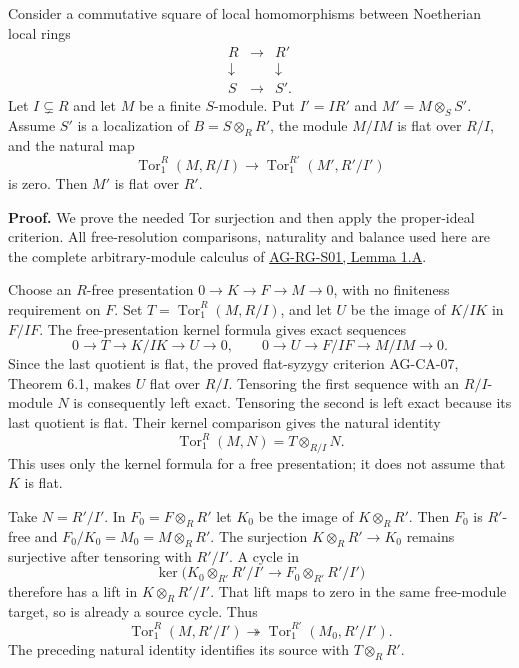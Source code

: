 \documentclass[11pt,a4paper,openany]{report}
\begin{document}
Consider a commutative square of local homomorphisms between Noetherian local rings \[
\begin{array}{ccc}
R&\longrightarrow&R'\\
\downarrow&&\downarrow\\
S&\longrightarrow&S'.
\end{array}
\] Let \(I\subsetneq R\) and let \(M\) be a finite \(S\)-module. Put \(I'=IR'\) and \(M'=M\otimes_SS'\). Assume \(S'\) is a localization of \(B=S\otimes_RR'\), the module \(M/IM\) is flat over \(R/I\), and the natural map \[\operatorname{Tor}_1^R(M,R/I)
\longrightarrow\operatorname{Tor}_1^{R'}(M',R'/I')\] is zero. Then \(M'\) is flat over \(R'\).

\textbf{Proof.} We prove the needed Tor surjection and then apply the proper-ideal criterion. All free-resolution comparisons, naturality and balance used here are the complete arbitrary-module calculus of \href{https://github.com/KokunoYumeto/open-math-courses/blob/main/docs/courses/AG-RG/AG-RG-S01.md\#tor-calculus}{AG-RG-S01, Lemma 1.A}.

Choose an \(R\)-free presentation \(0\to K\to F\to M\to0\), with no finiteness requirement on \(F\). Set \(T=\operatorname{Tor}_1^R(M,R/I)\), and let \(U\) be the image of \(K/IK\) in \(F/IF\). The free-presentation kernel formula gives exact sequences \[0\to T\to K/IK\to U\to0,\qquad
0\to U\to F/IF\to M/IM\to0.\] Since the last quotient is flat, the proved flat-syzygy criterion AG-CA-07, Theorem 6.1, makes \(U\) flat over \(R/I\). Tensoring the first sequence with an \(R/I\)-module \(N\) is consequently left exact. Tensoring the second is left exact because its last quotient is flat. Their kernel comparison gives the natural identity \[\operatorname{Tor}_1^R(M,N)=T\otimes_{R/I}N.\] This uses only the kernel formula for a free presentation; it does not assume that \(K\) is flat.

Take \(N=R'/I'\). In \(F_0=F\otimes_RR'\) let \(K_0\) be the image of \(K\otimes_RR'\). Then \(F_0\) is \(R'\)-free and \(F_0/K_0=M_0=M\otimes_RR'\). The surjection \(K\otimes_RR'\to K_0\) remains surjective after tensoring with \(R'/I'\). A cycle in \[\ker\bigl(K_0\otimes_{R'}R'/I'\to F_0\otimes_{R'}R'/I'\bigr)\] therefore has a lift in \(K\otimes_RR'/I'\). That lift maps to zero in the same free-module target, so is already a source cycle. Thus \[\operatorname{Tor}_1^R(M,R'/I')
\twoheadrightarrow\operatorname{Tor}_1^{R'}(M_0,R'/I').\] The preceding natural identity identifies its source with \(T\otimes_RR'\).
\end{document}
